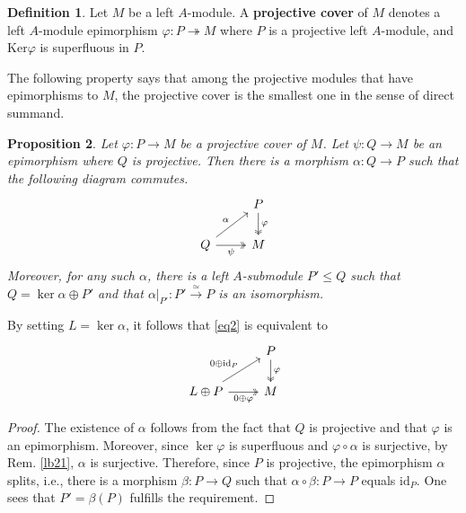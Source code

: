 \documentclass[11pt,b5paper,notitlepage]{article}
\theoremstyle{definition}
\newtheorem{df}{Definition}[section]
\theoremstyle{plain}
\newtheorem{pp}[df]{Proposition}
\newcommand{\id}{\mathrm{id}}
\newcommand{\Ker}{\mathrm{Ker}}
\numberwithin{equation}{section}
\begin{document}
\begin{df}
Let $M$ be a left $A$-module. A \textbf{projective cover} of $M$ denotes a left $A$-module epimorphism $\varphi:P\twoheadrightarrow M$ where $P$ is a projective left $A$-module, and $\Ker\varphi$ is superfluous in $P$.
\end{df}


The following property says that among the projective modules that have epimorphisms to $M$, the projective cover is the smallest one in the sense of direct summand.


\begin{pp}\label{lb23}
Let $\varphi:P\rightarrow M$ be a projective cover of $M$. Let $\psi:Q\rightarrow M$ be an epimorphism where $Q$ is projective. Then there is a morphism $\alpha:Q\rightarrow P$ such that the following diagram commutes. 
\begin{equation}\label{eq2}
\begin{tikzcd}
                       & P \arrow[d,"\varphi", two heads] \\
Q \arrow[ru,"\alpha"] \arrow[r,"\psi"', two heads] & M          
\end{tikzcd}
\end{equation}
Moreover, for any such $\alpha$, there is a left $A$-submodule $P'\leq Q$ such that $Q=\ker\alpha\oplus P'$ and that $\alpha|_{P'}:P'\xrightarrow{\simeq} P$ is an isomorphism.
\end{pp}

By setting $L=\ker\alpha$, it follows that \eqref{eq2} is equivalent to
\begin{equation}\label{eq3}
\begin{tikzcd}
                       & P \arrow[d,"\varphi", two heads] \\
L\oplus P \arrow[ru,"0\oplus \id_P"] \arrow[r,"0\oplus\varphi"', two heads] & M          
\end{tikzcd}
\end{equation}


\begin{proof}
The existence of $\alpha$ follows from the fact that $Q$ is projective and that $\varphi$ is an epimorphism. Moreover, since $\ker\varphi$ is superfluous and $\varphi\circ\alpha$ is surjective, by Rem. \ref{lb21}, $\alpha$ is surjective. Therefore, since $P$ is projective, the epimorphism $\alpha$ splits, i.e., there is a morphism $\beta:P\rightarrow Q$ such that $\alpha\circ\beta:P\rightarrow P$ equals $\id_P$. One sees that $P'=\beta(P)$ fulfills the requirement.
\end{proof}
\end{document}
